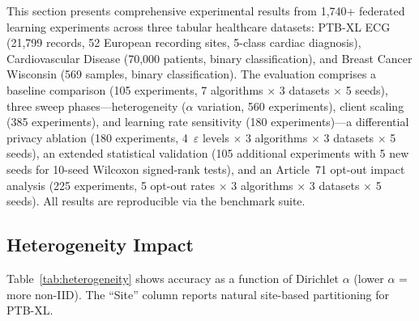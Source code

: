 \documentclass[conference]{IEEEtran}
\begin{document}
This section presents comprehensive experimental results from 1,740+ federated learning experiments across three tabular healthcare datasets: PTB-XL ECG (21,799 records, 52 European recording sites, 5-class cardiac diagnosis), Cardiovascular Disease (70,000 patients, binary classification), and Breast Cancer Wisconsin (569 samples, binary classification). The evaluation comprises a baseline comparison (105 experiments, 7 algorithms $\times$ 3 datasets $\times$ 5 seeds), three sweep phases---heterogeneity ($\alpha$ variation, 560 experiments), client scaling (385 experiments), and learning rate sensitivity (180 experiments)---a differential privacy ablation (180 experiments, 4~$\varepsilon$ levels $\times$ 3 algorithms $\times$ 3 datasets $\times$ 5 seeds), an extended statistical validation (105 additional experiments with 5 new seeds for 10-seed Wilcoxon signed-rank tests), and an Article~71 opt-out impact analysis (225 experiments, 5 opt-out rates $\times$ 3 algorithms $\times$ 3 datasets $\times$ 5 seeds). All results are reproducible via the benchmark suite.

\subsection{Heterogeneity Impact}

Table~\ref{tab:heterogeneity} shows accuracy as a function of Dirichlet $\alpha$ (lower $\alpha$ = more non-IID). The ``Site'' column reports natural site-based partitioning for PTB-XL.
\end{document}

